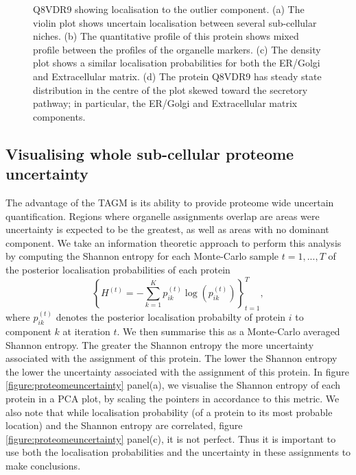 \documentclass[12pt,english]{article}
\begin{document}
\begin{figure}[h]
  \caption{Q8VDR9 showing localisation to the
  outlier component.
  (a) The violin plot shows
    uncertain localisation between several sub-cellular niches. (b) The
    quantitative profile of this protein shows mixed profile between the
    profiles of the organelle markers. (c) The density plot shows a
    similar localisation probabilities for both the ER/Golgi and Extracellular
    matrix. (d) The protein Q8VDR9 has steady state
    distribution in the centre of the plot skewed toward the secretory pathway; in particular,
    the ER/Golgi and Extracellular matrix components.}
  \label{fig:Q8VDR9}
\end{figure}





\clearpage

\subsection{Visualising whole sub-cellular proteome uncertainty}

The advantage of the TAGM is its ability to provide proteome wide
uncertain quantification. Regions where organelle assignments overlap
are areas were uncertainty is expected to be the greatest, as well
as areas with no dominant component. We take an information
theoretic approach to perform this analysis by computing
the Shannon entropy \citep{shannon:1948} for each Monte-Carlo sample $t = 1,...,T$ of
the posterior localisation probabilities of each protein
\begin{equation}
\left\{H^{(t)} = - \sum_{k=1}^Kp^{(t)}_{ik} \log\left(p^{(t)}_{ik}\right)\right\}^{T}_{t=1},
\end{equation}
where $p^{(t)}_{ik}$ denotes the posterior localisation probabilty of protein $i$ to component $k$
at iteration $t$. We then summarise this as a Monte-Carlo averaged Shannon entropy.
The greater the Shannon entropy the more uncertainty
associated with the assignment of this protein. The lower the Shannon entropy
the lower the uncertainty associated with the assignment of this protein.
In figure \ref{figure:proteomeuncertainty} panel(a), we visualise the Shannon entropy
of each protein in a PCA plot, by scaling the pointers in accordance to this
metric. We also note
that while localisation probability (of a protein to its most probable location)
and the Shannon entropy are correlated, figure \ref{figure:proteomeuncertainty} panel(c), it is not perfect. Thus
it is important to use both the localisation probabilities and the uncertainty in
these assignments to make conclusions.
\end{document}
